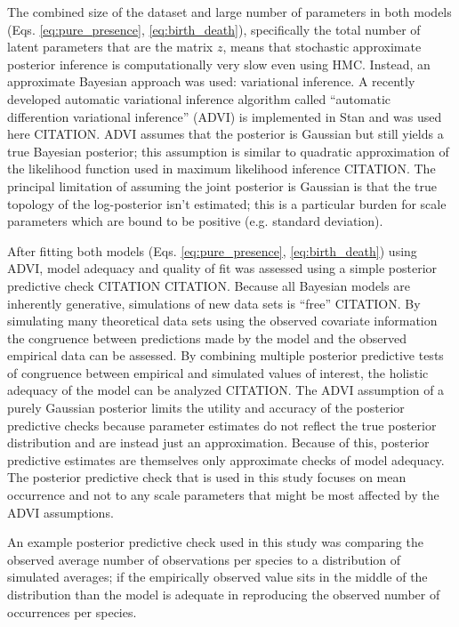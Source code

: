 \documentclass[12pt,letterpaper]{article}
\begin{document}
The combined size of the dataset and large number of parameters in both models (Eqs. \ref{eq:pure_presence}, \ref{eq:birth_death}), specifically the total number of latent parameters that are the matrix \(z\), means that stochastic approximate posterior inference is computationally very slow even using HMC. Instead, an approximate Bayesian approach was used: variational inference. A recently developed automatic variational inference algorithm called ``automatic differention variational inference'' (ADVI) is implemented in Stan and was used here CITATION. ADVI assumes that the posterior is Gaussian but still yields a true Bayesian posterior; this assumption is similar to quadratic approximation of the likelihood function used in maximum likelihood inference CITATION. The principal limitation of assuming the joint posterior is Gaussian is that the true topology of the log-posterior isn't estimated; this is a particular burden for scale parameters which are bound to be positive (e.g. standard deviation).


After fitting both models (Eqs. \ref{eq:pure_presence}, \ref{eq:birth_death}) using ADVI, model adequacy and quality of fit was assessed using a simple posterior predictive check CITATION CITATION. Because all Bayesian models are inherently generative, simulations of new data sets is ``free'' CITATION. By simulating many theoretical data sets using the observed covariate information the congruence between predictions made by the model and the observed empirical data can be assessed. By combining multiple posterior predictive tests of congruence between empirical and simulated values of interest, the holistic adequacy of the model can be analyzed CITATION. The ADVI assumption of a purely Gaussian posterior limits the utility and accuracy of the posterior predictive checks because parameter estimates do not reflect the true posterior distribution and are instead just an approximation. Because of this, posterior predictive estimates are themselves only approximate checks of model adequacy. The posterior predictive check that is used in this study focuses on mean occurrence and not to any scale parameters that might be most affected by the ADVI assumptions.

An example posterior predictive check used in this study was comparing the observed average number of observations per species to a distribution of simulated averages; if the empirically observed value sits in the middle of the distribution than the model is adequate in reproducing the observed number of occurrences per species. 
\end{document}

